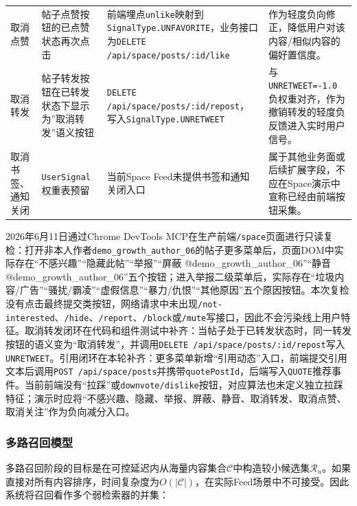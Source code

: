 \begin{longtable}{L{0.11\textwidth}L{0.17\textwidth}L{0.23\textwidth}L{0.31\textwidth}}
  取消点赞      & 帖子点赞按钮的已点赞状态再次点击                            & 前端埋点\texttt{unlike}映射到\texttt{SignalType.UNFAVORITE}，业务接口为\texttt{DELETE /api/space/posts/:id/like}          & 作为轻度负向修正，降低用户对该内容/相似内容的偏好置信度。                                                                      \\
  取消转发      & 帖子转发按钮在已转发状态下显示为”取消转发”语义按钮                  & \texttt{DELETE /api/space/posts/:id/repost}，写入\texttt{SignalType.UNRETWEET}                                  & 与\texttt{UNRETWEET=-1.0}负权重对齐，作为撤销转发的轻度负反馈进入实时用户信号。                                                \\
  取消书签、通知关闭 & \texttt{UserSignal}权重表预留                    & 当前Space Feed未提供书签和通知关闭入口                                                                                     & 属于其他业务面或后续扩展字段，不应在Space演示中宣称已经由前端按钮采集。                                                             \\
  \bottomrule
\end{longtable}
\endgroup

2026年6月11日通过Chrome DevTools MCP在生产前端\texttt{/space}页面进行只读复检：打开非本人作者\texttt{demo\_growth\_author\_06}的帖子更多菜单后，页面DOM中实际存在“不感兴趣”“隐藏此帖”“举报”“屏蔽 @demo\_growth\_author\_06”“静音 @demo\_growth\_author\_06”五个按钮；进入举报二级菜单后，实际存在“垃圾内容/广告”“骚扰/霸凌”“虚假信息”“暴力/仇恨”“其他原因”五个原因按钮。本次复检没有点击最终提交类按钮，网络请求中未出现\texttt{/not-interested}、\texttt{/hide}、\texttt{/report}、\texttt{/block}或\texttt{/mute}写接口，因此不会污染线上用户特征。取消转发闭环在代码和组件测试中补齐：当帖子处于已转发状态时，同一转发按钮的语义变为“取消转发”，并调用\texttt{DELETE /api/space/posts/:id/repost}写入\texttt{UNRETWEET}。引用闭环在本轮补齐：更多菜单新增“引用动态”入口，前端提交引用文本后调用\texttt{POST /api/space/posts}并携带\texttt{quotePostId}，后端写入\texttt{QUOTE}推荐事件。当前前端没有“拉踩”或\texttt{downvote/dislike}按钮，对应算法也未定义独立拉踩特征；演示时应将“不感兴趣、隐藏、举报、屏蔽、静音、取消转发、取消点赞、取消关注”作为负向减分入口。

\subsubsection{多路召回模型}

多路召回阶段的目标是在可控延迟内从海量内容集合$\mathcal{C}$中构造较小候选集$\mathcal{R}_u$。如果直接对所有内容排序，时间复杂度为$O(|\mathcal{C}|)$，在实际Feed场景中不可接受。因此系统将召回看作多个弱检索器的并集：

